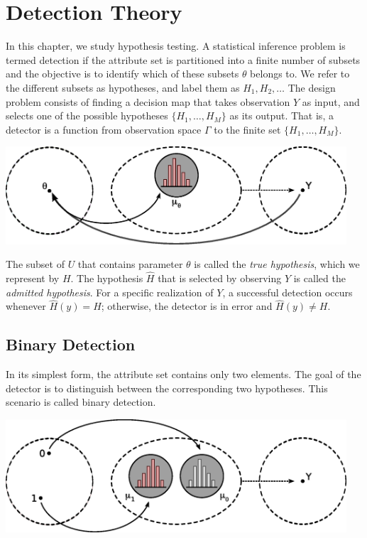 \chapter{Detection Theory}
\label{chapter:Detection}

In this chapter, we study hypothesis testing.
A statistical inference problem is termed detection if the attribute set is partitioned into a finite number of subsets and the objective is to identify which of these subsets $\theta$ belongs to.
We refer to the different subsets as hypotheses, and label them as $H_1, H_2, \ldots$
The design problem consists of finding a decision map that takes observation $Y$ as input, and selects one of the possible hypotheses $\{ H_1, \ldots, H_M \}$ as its output.
That is, a detector is a function from observation space $\Gamma$ to the finite set $\{ H_1, \ldots, H_M \}$.

\begin{center}
\includegraphics[width=5in]{Figures/2Chapter/HypothesisTesting}
\end{center}

The subset of $U$ that contains parameter $\theta$ is called the \emph{true hypothesis}, which we represent by $H$.
The hypothesis $\hat{H}$ that is selected by observing $Y$ is called the \emph{admitted hypothesis}.
For a specific realization of $Y$, a successful detection occurs whenever $\hat{H}(y) = H$; otherwise, the detector is in error and $\hat{H}(y) \neq H$.


\section{Binary Detection}

In its simplest form, the attribute set contains only two elements.
The goal of the detector is to distinguish between the corresponding two hypotheses.
This scenario is called binary detection.

\begin{center}
\includegraphics[width=5in]{Figures/2Chapter/BinaryDetection}
\end{center}


